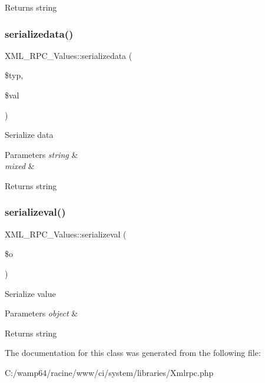 \begin{DoxyReturn}{Returns}
string 
\end{DoxyReturn}
\mbox{\label{class_x_m_l___r_p_c___values_a53c5baae3f4bc1089dfe5f2967c2ef1a}} 
\subsubsection{\texorpdfstring{serializedata()}{serializedata()}}
{\footnotesize\ttfamily X\+M\+L\+\_\+\+R\+P\+C\+\_\+\+Values\+::serializedata (\begin{DoxyParamCaption}\item[{}]{\$typ,  }\item[{}]{\$val }\end{DoxyParamCaption})}

Serialize data


\begin{DoxyParams}{Parameters}
{\em string} & \\
\hline
{\em mixed} & \\
\hline
\end{DoxyParams}
\begin{DoxyReturn}{Returns}
string 
\end{DoxyReturn}
\mbox{\label{class_x_m_l___r_p_c___values_abd92892449f7572e9ed8eac041b2acda}} 
\subsubsection{\texorpdfstring{serializeval()}{serializeval()}}
{\footnotesize\ttfamily X\+M\+L\+\_\+\+R\+P\+C\+\_\+\+Values\+::serializeval (\begin{DoxyParamCaption}\item[{}]{\$o }\end{DoxyParamCaption})}

Serialize value


\begin{DoxyParams}{Parameters}
{\em object} & \\
\hline
\end{DoxyParams}
\begin{DoxyReturn}{Returns}
string 
\end{DoxyReturn}


The documentation for this class was generated from the following file\+:\begin{DoxyCompactItemize}
\item 
C\+:/wamp64/racine/www/ci/system/libraries/Xmlrpc.\+php\end{DoxyCompactItemize}
